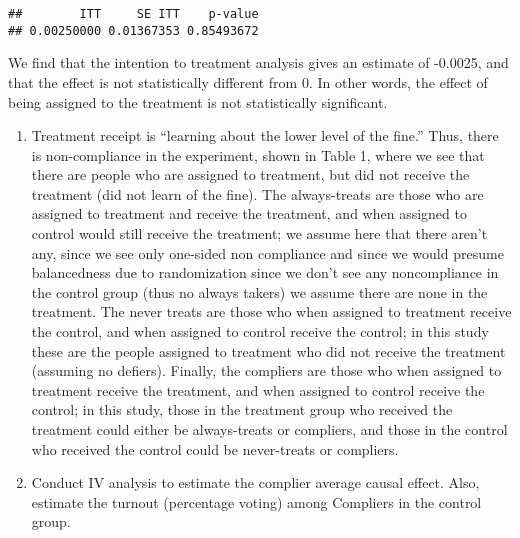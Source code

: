 \documentclass[
]{article}
\begin{document}
\begin{verbatim}
##        ITT     SE ITT    p-value 
## 0.00250000 0.01367353 0.85493672
\end{verbatim}

We find that the intention to treatment analysis gives an estimate of
-0.0025, and that the effect is not statistically different from 0. In
other words, the effect of being assigned to the treatment is not
statistically significant.

\begin{enumerate}
\def\labelenumi{(\alph{enumi})}
\setcounter{enumi}{2}
\item
  Treatment receipt is ``learning about the lower level of the fine.''
  Thus, there is non-compliance in the experiment, shown in Table 1,
  where we see that there are people who are assigned to treatment, but
  did not receive the treatment (did not learn of the fine). The
  always-treats are those who are assigned to treatment and receive the
  treatment, and when assigned to control would still receive the
  treatment; we assume here that there aren't any, since we see only
  one-sided non compliance and since we would presume balancedness due
  to randomization since we don't see any noncompliance in the control
  group (thus no always takers) we assume there are none in the
  treatment. The never treats are those who when assigned to treatment
  receive the control, and when assigned to control receive the control;
  in this study these are the people assigned to treatment who did not
  receive the treatment (assuming no defiers). Finally, the compliers
  are those who when assigned to treatment receive the treatment, and
  when assigned to control receive the control; in this study, those in
  the treatment group who received the treatment could either be
  always-treats or compliers, and those in the control who received the
  control could be never-treats or compliers.
\item
  Conduct IV analysis to estimate the complier average causal effect.
  Also, estimate the turnout (percentage voting) among Compliers in the
  control group.
\end{enumerate}
\end{document}

